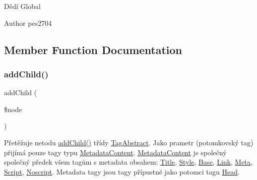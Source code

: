 Dědí Global

\begin{DoxyAuthor}{Author}
pes2704 
\end{DoxyAuthor}


\subsection{Member Function Documentation}
\mbox{\label{class_pes_1_1_dom_1_1_node_1_1_tag_1_1_head_a1d59c3782ba90a94f31ee6c58d86e9fc}} 
\subsubsection{\texorpdfstring{add\+Child()}{addChild()}}
{\footnotesize\ttfamily add\+Child (\begin{DoxyParamCaption}\item[{\mbox{\hyperlink{interface_pes_1_1_dom_1_1_node_1_1_node_interface}{Node\+Interface}}}]{\$node }\end{DoxyParamCaption})}

Přetěžuje netodu \mbox{\hyperlink{class_pes_1_1_dom_1_1_node_1_1_tag_1_1_head_a1d59c3782ba90a94f31ee6c58d86e9fc}{add\+Child()}} třídy \mbox{\hyperlink{class_pes_1_1_dom_1_1_node_1_1_tag_1_1_tag_abstract}{Tag\+Abstract}}. Jako prametr (potomkovský tag) přijímá pouze tagy typu \mbox{\hyperlink{class_pes_1_1_dom_1_1_node_1_1_tag_1_1_metadata_content}{Metadata\+Content}}. \mbox{\hyperlink{class_pes_1_1_dom_1_1_node_1_1_tag_1_1_metadata_content}{Metadata\+Content}} je společný společný předek všem tagům s metadata obsahem\+: \mbox{\hyperlink{class_pes_1_1_dom_1_1_node_1_1_tag_1_1_title}{Title}}, \mbox{\hyperlink{class_pes_1_1_dom_1_1_node_1_1_tag_1_1_style}{Style}}, \mbox{\hyperlink{class_pes_1_1_dom_1_1_node_1_1_tag_1_1_base}{Base}}, \mbox{\hyperlink{class_pes_1_1_dom_1_1_node_1_1_tag_1_1_link}{Link}}, \mbox{\hyperlink{class_pes_1_1_dom_1_1_node_1_1_tag_1_1_meta}{Meta}}, \mbox{\hyperlink{class_pes_1_1_dom_1_1_node_1_1_tag_1_1_script}{Script}}, \mbox{\hyperlink{class_pes_1_1_dom_1_1_node_1_1_tag_1_1_noscript}{Noscript}}. Metadata tagy jsou tagy přípustné jako potomci tagu \mbox{\hyperlink{class_pes_1_1_dom_1_1_node_1_1_tag_1_1_head}{Head}}.


